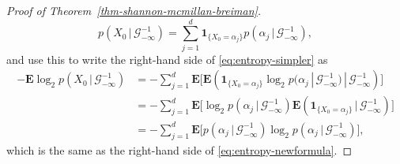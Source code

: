 \documentclass[12pt]{article}
\newcommand{\expec}{\mathbf{E}}
\newcommand{\condexp}[2]{\expec\left(#1\,|\,#2\right)}
\newcommand{\ind}{\textbf{1}}
\theoremstyle{example}
\begin{document}
\begin{proof}[Proof of Theorem~\ref{thm-shannon-mcmillan-breiman}]
$$ p(X_0\,|\,\mathcal{G}_{-\infty}^{-1}) = \sum_{j=1}^d \ind_{\{X_0=\alpha_j\}} p(\alpha_j\,|\,\mathcal{G}_{-\infty}^{-1}), $$
and use this to write the right-hand side of \eqref{eq:entropy-simpler} as
\begin{align*}
-\expec \log_2 p(X_0\,|\,\mathcal{G}_{-\infty}^{-1})
&=
-\sum_{j=1}^d \expec\Big[
\condexp{ 
\ind_{\{X_0=\alpha_j\}}
\log_2 p(\alpha_j\,|\,\mathcal{G}_{-\infty}^{-1})
}{\mathcal{G}_{-\infty}^{-1}}
\Big]
\\ &= -\sum_{j=1}^d \expec\Big[ \log_2 p(\alpha_j\,|\,\mathcal{G}_{-\infty}^{-1})
\condexp{\ind_{\{X_0=\alpha_j\}}}{\mathcal{G}_{-\infty}^{-1}}
\Big]
\\ &= -\sum_{j=1}^d \expec\Big[
p(\alpha_j\,|\,\mathcal{G}_{-\infty}^{-1})
\log_2 p(\alpha_j\,|\,\mathcal{G}_{-\infty}^{-1})
\Big],
\end{align*}
which is the same as the right-hand side of \eqref{eq:entropy-newformula}.


\end{proof}
\end{document}
